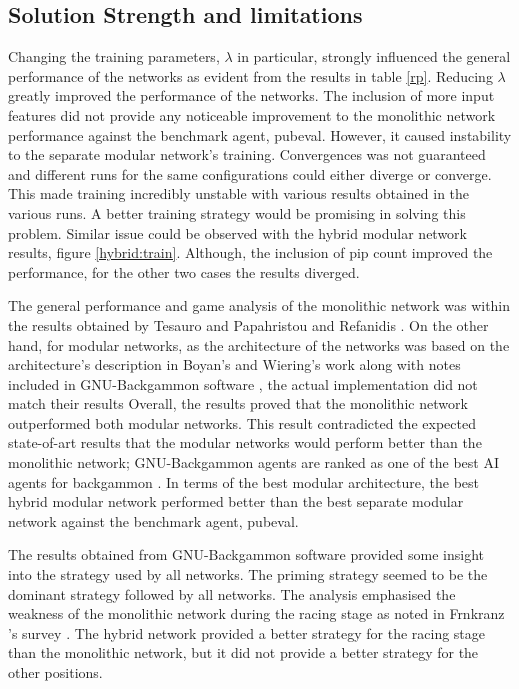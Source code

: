 \documentclass[12pt,a4paper]{article}
\begin{document}
\subsection{Solution Strength and limitations}
Changing the training parameters, $\lambda$ in particular, strongly influenced the general performance of the networks as evident from the results in table \ref{rp}. Reducing $\lambda$ greatly improved the performance of the networks. The inclusion of more input features did not provide any noticeable improvement to the monolithic network performance against the benchmark agent, pubeval. However, it caused instability to the separate modular network's training. Convergences was not guaranteed and different runs for the same configurations could either diverge or converge. This made training incredibly unstable with various results obtained in the various runs. A better training strategy would be promising in solving this problem. Similar issue could be observed with the hybrid modular network results, figure \ref{hybrid:train}. Although, the inclusion of pip count improved the performance, for the other two cases the results diverged. 

The general performance and game analysis of the monolithic network was within the results obtained by Tesauro \citeyear{DBLP:journals/ai/Tesauro02} and Papahristou and Refanidis \citeyear{DBLP:conf/ifip12/PapahristouR12}. On the other hand, for modular networks, as the architecture of the networks was based on the architecture's description in Boyan's \citeyear{boyan} and Wiering's \citeyear{DBLP:journals/jilsa/Wiering10} work along with notes included in GNU-Backgammon software \cite{gnubg}, the actual implementation did not match their results Overall, the results proved that the monolithic network outperformed both modular networks. This result contradicted the expected state-of-art results that the modular networks would perform better than the monolithic network; GNU-Backgammon agents are ranked as one of the best AI agents for backgammon \cite{exg}. In terms of the best modular architecture, the best hybrid modular network performed better than the best separate modular network against the benchmark agent, pubeval. 

The results obtained from GNU-Backgammon software provided some insight into the strategy used by all networks. The priming strategy seemed to be the dominant strategy followed by all networks. The analysis emphasised the weakness of the monolithic network during the racing stage as noted in Frnkranz 's survey \citeyear{survey}. The hybrid network provided a better strategy for the racing stage than the monolithic network, but it did not provide a better strategy for the other positions. 
\end{document}
